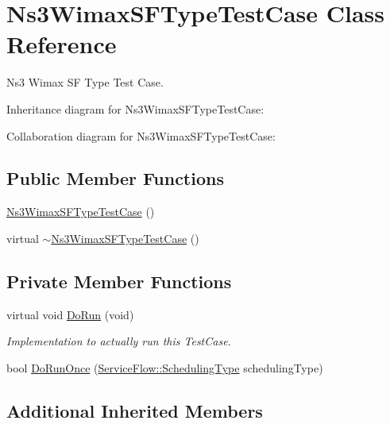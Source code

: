 \hypertarget{classNs3WimaxSFTypeTestCase}{}\section{Ns3\+Wimax\+S\+F\+Type\+Test\+Case Class Reference}
\label{classNs3WimaxSFTypeTestCase}


Ns3 Wimax SF Type Test Case.  




Inheritance diagram for Ns3\+Wimax\+S\+F\+Type\+Test\+Case\+:


Collaboration diagram for Ns3\+Wimax\+S\+F\+Type\+Test\+Case\+:
\subsection*{Public Member Functions}
\begin{DoxyCompactItemize}
\item 
\hyperlink{classNs3WimaxSFTypeTestCase_af680bb0a06df2914d1b0580f50d3dba1}{Ns3\+Wimax\+S\+F\+Type\+Test\+Case} ()
\item 
virtual \hyperlink{classNs3WimaxSFTypeTestCase_ae600fbca3ccbff82a4079a1124b82922}{$\sim$\+Ns3\+Wimax\+S\+F\+Type\+Test\+Case} ()
\end{DoxyCompactItemize}
\subsection*{Private Member Functions}
\begin{DoxyCompactItemize}
\item 
virtual void \hyperlink{classNs3WimaxSFTypeTestCase_a718e915575ebf4e0f3e90d5330fe6771}{Do\+Run} (void)
\begin{DoxyCompactList}\small\item\em Implementation to actually run this Test\+Case. \end{DoxyCompactList}\item 
bool \hyperlink{classNs3WimaxSFTypeTestCase_abb7c555fc0a6ff152bf0d47ac567d62d}{Do\+Run\+Once} (\hyperlink{classns3_1_1ServiceFlow_a7990ba10be1e098328fd1e6382a26235}{Service\+Flow\+::\+Scheduling\+Type} scheduling\+Type)
\end{DoxyCompactItemize}
\subsection*{Additional Inherited Members}


